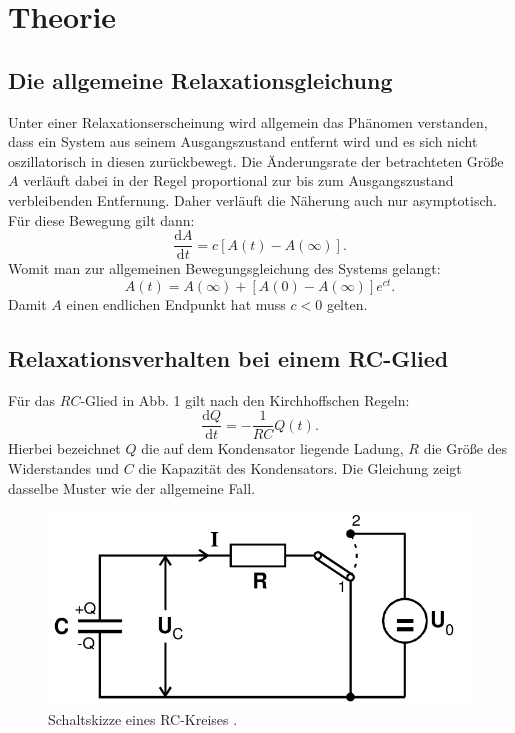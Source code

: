 \section{Theorie}
\label{sec:Theorie}
\subsection{Die allgemeine Relaxationsgleichung}
Unter einer Relaxationserscheinung wird allgemein das Phänomen verstanden, dass
 ein System aus seinem Ausgangszustand entfernt wird und es sich nicht oszillatorisch
 in diesen zurückbewegt. Die Änderungsrate der betrachteten Größe $A$ verläuft dabei
 in der Regel proportional zur bis zum Ausgangszustand verbleibenden Entfernung. Daher
  verläuft die Näherung auch nur asymptotisch. Für diese
 Bewegung gilt dann:
 \begin{equation}
   \frac{\text{d}A}{\text{d}t} = c[A(t)-A(\infty)]\text{.}
 \end{equation}
Womit man zur allgemeinen Bewegungsgleichung des Systems gelangt:
\begin{equation}
  A(t) = A(\infty)+[A(0)-A(\infty)]e^{ct}\text{.}
\end{equation}
Damit $A$ einen endlichen Endpunkt hat muss $ c < 0$ gelten.

\subsection{Relaxationsverhalten bei einem RC-Glied}

Für das $RC$-Glied in Abb. 1 gilt nach den Kirchhoffschen Regeln:
\begin{equation}
  \frac{\text{d}Q}{\text{d}t} = -\frac{1}{RC}Q(t)\text{.}
\end{equation}
Hierbei bezeichnet $Q$ die auf dem Kondensator liegende
 Ladung, $R$ die Größe des Widerstandes und $C$ die Kapazität des Kondensators.
Die Gleichung zeigt dasselbe Muster wie der allgemeine Fall.
\begin{figure}[H]
  \centering
  \includegraphics[width=\linewidth-200pt,height=\textheight-200pt,keepaspectratio]{content/RC_Kreis1.png}
  \caption{Schaltskizze eines RC-Kreises \cite{V353}.}
  \label{fig:RC_Kreis1}
\end{figure}

